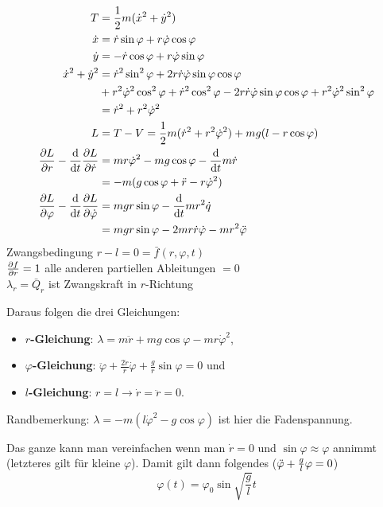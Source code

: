 \begin{beispiel*}
\begin{align*}
T &= \frac12 m (\dot{x}^2 + \dot{y}^2)\\
\dot{x} &= \dot{r} \sin \varphi + r \dot{\varphi} \cos \varphi\\
\dot{y} &= - \dot{r} \cos \varphi + r \dot{\varphi} \sin \varphi\\
\dot{x}^2 + \dot{y}^2 &= \dot{r}^2 \sin^2 \varphi + 2 r \dot{r} \dot\varphi \sin \varphi \cos \varphi \\
&+ r^2 \dot{\varphi}^2 \cos^2 \varphi + \dot{r}^2 \cos^2 \varphi - 2 r \dot r \dot \varphi \sin \varphi \cos \varphi + r^2 \dot{\varphi}^2 \sin^2 \varphi \\
&= \dot{r}^2 + r^2 \dot{\varphi}^2\\
L &= T-V = \frac12 m (\dot{r}^2 + r^2 \dot{\varphi}^2) + mg(l - r \cos \varphi)\\
\frac{\partial L}{\partial r} - \frac{\mathrm d}{\mathrm d t} \frac{\partial L}{\partial \dot{r}} &= m r \dot{\varphi}^2 - mg \cos \varphi - \frac{\mathrm d}{\mathrm d t} m \dot{r} \\
&= -m (g \cos \varphi + \ddot{r} - r \dot{\varphi}^2)\\
\frac{\partial L}{\partial \varphi} - \frac{\mathrm d}{\mathrm d t} \frac{\partial L}{\partial \dot{\varphi}} &= mgr \sin \varphi - \frac{\mathrm d}{\mathrm d t} m r^2 \dot{q} \\
&= mgr \sin \varphi - 2mr\dot{r}\dot{\varphi} - mr^2 \ddot{\varphi}\\
\end{align*}
Zwangsbedingung $r-l = 0 = \bar{f}(r, \varphi, t)$\\
$\frac{\partial f}{\partial r} = 1$ alle anderen partiellen Ableitungen $= 0$\\
\conseq $\lambda_r = \bar{Q}_r$ ist Zwangskraft in $r$-Richtung

Daraus folgen die drei Gleichungen:
\begin{itemize}
	\item \textbf{$r$-Gleichung}: $\lambda = m \ddot{r} + mg \cos \varphi - m r \dot{\varphi}^2$,
	\item \textbf{$\varphi$-Gleichung}: $\ddot{\varphi} + \frac{2 \dot{r}}{r} \dot{\varphi} + \frac{g}{r} \sin \varphi = 0$ und
	\item \textbf{$l$-Gleichung}: $r = l \rightarrow \dot{r} = \ddot{r} = 0$.
\end{itemize}
Randbemerkung: $\lambda = -m(l \dot{\varphi}^2 - g \cos \varphi)$ ist hier die Fadenspannung.

Das ganze kann man vereinfachen wenn man $\dot{r} = 0$ und $\sin \varphi \approx \varphi$ annimmt (letzteres gilt für kleine $\varphi$). Damit gilt dann folgendes ($\ddot{\varphi} + \frac{g}{l} \varphi = 0$)
$$\varphi(t) = \varphi_0 \sin \sqrt{\frac{g}{l}} t$$
\end{beispiel*}

